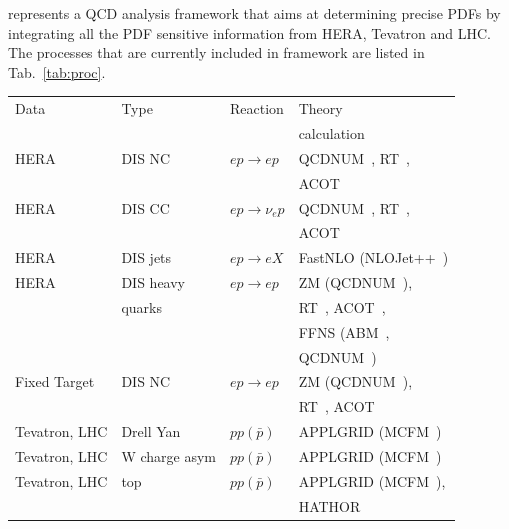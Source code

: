 \fitter represents a QCD analysis framework that aims at 
determining precise PDFs by integrating all the PDF sensitive information
from HERA, Tevatron and LHC.
%
The processes that are currently included in \fitter framework are listed in Tab.~\ref{tab:proc}.
%
\begin{table}
\small
\scriptsize

\begin{tabular}{|l|l|l|l|}
\hline
Data &Type &  Reaction & Theory      \\
        &     &     & calculation \\
\hline

HERA &DIS NC   &$ep\to ep$      & QCDNUM~\cite{qcdnum}, RT~\cite{Thorne:1997ga,Thorne:2006qt,Martin:epC63,Thorne:6180}, \\
     &         &                & ACOT~\cite{CWZ} \\
HERA &DIS CC   &$ep\to \nu_e p$ & QCDNUM~\cite{qcdnum}, RT~\cite{Thorne:1997ga,Thorne:2006qt,Martin:epC63,Thorne:6180}, \\
     &         &                & ACOT~\cite{CWZ} \\
HERA &DIS jets &$ep\to eX$      & FastNLO (NLOJet++~\cite{Nagy:1998bb,Nagy:2001fj})\\
HERA &DIS heavy                 & $ep\to ep $& ZM (QCDNUM~\cite{qcdnum}), \\
     & quarks  &                & RT~\cite{Thorne:1997ga,Thorne:2006qt,Martin:epC63,Thorne:6180}, ACOT~\cite{CWZ}, \\
     &         &                & FFNS (ABM~\cite{Alekhin:runm,openqcdrad:page}, \\
     &         &                & QCDNUM~\cite{qcdnum}) \\
\hline
Fixed Target   &DIS NC          &$ep\to ep$ & ZM (QCDNUM~\cite{qcdnum}), \\
     &         &                & RT~\cite{Thorne:1997ga,Thorne:2006qt,Martin:epC63,Thorne:6180}, ACOT~\cite{CWZ} \\
\hline
Tevatron, LHC &Drell Yan &$pp(\bar p)$ & APPLGRID (MCFM~\cite{Campbell:1999ah,Campbell:2000je,Campbell:2010ff}) \\
Tevatron, LHC &W charge asym &$pp(\bar p)$ & APPLGRID (MCFM~\cite{Campbell:1999ah,Campbell:2000je,Campbell:2010ff}) \\
Tevatron, LHC &top &$pp(\bar p)$  & APPLGRID (MCFM~\cite{Campbell:1999ah,Campbell:2000je,Campbell:2010ff}),  \\
              &    &              & HATHOR~\cite{Aliev:2010zk} \\

\end{tabular}
\end{table}
